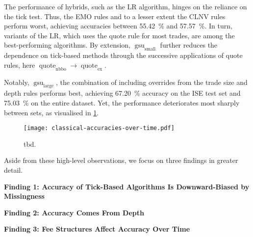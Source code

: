 The performance of hybrids, such as the \gls{LR} algorithm, hinges on the reliance on the tick test. Thus, the \gls{EMO} rules and to a lesser extent the \gls{CLNV} rules perform worst, achieving accuracies between \SI{55.42}{\percent} and \SI{57.57}{\percent}. In turn, variants of the \gls{LR}, which uses the quote rule for most trades, are among the best-performing algorithms. By extension, $\operatorname{gsu}_{\mathrm{small}}$ further reduces the dependence on tick-based methods through the successive applications of quote rules, here $\operatorname{quote}_{\mathrm{nbbo}} \to \operatorname{quote}_{\mathrm{ex}}$.

Notably, $\operatorname{gsu}_{\mathrm{large}}$, the combination of \textcite[][33]{grauerOptionTradeClassification2022} including overrides from the trade size and depth rules performs best, achieving \SI{67.20}{\percent} accuracy on the \gls{ISE} test set and \SI{75.03}{\percent} on the entire dataset. Yet, the performance deteriorates most sharply between sets, as visualised in \cref{fig:classical-accuracies-over-time}.

\begin{figure}[ht]
    \centering
    \texttt{[image: classical-accuracies-over-time.pdf]}
    \caption[tbd]{tbd.}
    \label{fig:classical-accuracies-over-time}
\end{figure}


Aside from these high-level observations, we focus on three findings in greater detail. 

\textbf{Finding 1: Accuracy of Tick-Based Algorithms Is Downward-Biased by Missingness}

\textbf{Finding 2: Accuracy Comes From Depth}

\textbf{Finding 3: Fee Structures Affect Accuracy Over Time}

